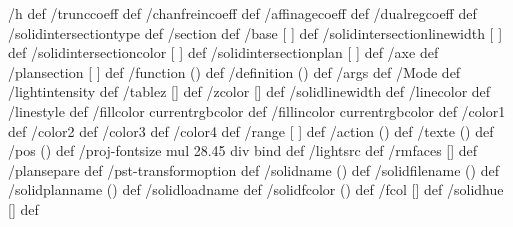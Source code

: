 /h \pst@solides@h\space def %
/trunccoeff \pst@solides@trunccoeff\space def %
/chanfreincoeff \pst@solides@chanfreincoeff\space def %
/affinagecoeff \pst@solides@affinagecoeff\space def %
/dualregcoeff \pst@solides@dualregcoeff\space def %
/solidintersectiontype \pst@solides@intersectiontype\space def %
/section {\pst@solides@section} def %
/base [ \pst@solides@base ] def
/solidintersectionlinewidth [ \pst@solides@intersectionlinewidth ] def
/solidintersectioncolor [ \pst@solides@intersectioncolor ] def
/solidintersectionplan [ \pst@solides@intersectionplan ] def
/axe  { \pst@solides@axe } def
/plansection  [ \pst@solides@plansection ] def
\ifx\pst@solides@function\@empty\else
  /function  (\pst@solides@function) def
\fi
%
/definition  (\pst@solides@definition) def
/args  { \pst@solides@args} def
/Mode \pst@solides@mode\space def %
/lightintensity \pst@solides@lightintensity\space def %
/tablez  [\pst@solides@tablez] def
/zcolor  [\pst@solides@zcolor] def
%
/solidlinewidth {\pst@number\pslinewidth} def
/linecolor  {\pst@usecolor\pslinecolor} def
/linestyle  {\pslinestyle} def
/fillcolor  {\pst@usecolor\psfillcolor currentrgbcolor} def
/fillincolor  {\pst@usecolor\psincolor currentrgbcolor} def
%
/color1 {\pst@usecolor\pscolora } def
/color2 {\pst@usecolor\pscolorb } def
/color3 {\pst@usecolor\pscolorc } def
/color4 {\pst@usecolor\pscolord } def
%
/range [ \pst@solides@range ] def
/action (\pst@solides@action) def
/texte (\pst@solides@text) def
/pos (\pst@solides@pos) def
/proj-fontsize {\pst@solides@fontsize\space \pst@number\psunit mul 28.45 div } bind def
%
\ifx\pst@solides@CoordinatesLight\@empty\else
  /lightsrc {\pst@solides@CoordinatesLight} def
\fi
%
/rmfaces [\pst@solides@CoordinatesRm] def
%
\ifx\pst@solides@plansepare\@empty\else
  /plansepare {\pst@solides@plansepare} def
\fi
%
\ifx\pst@solides@transform\@empty\else
  /pst-transformoption { \pst@solides@transform} def
\fi
%
\ifx\pst@solides@name\@empty\else
  /solidname (\pst@solides@name) def
\fi
\ifx\pst@solides@file\@empty\else
  /solidfilename (\pst@solides@file) def
\fi
%
\ifx\pst@solides@planname\@empty\else
  /solidplanname (\pst@solides@planname) def
\fi
%
\ifx\pst@solides@load\@empty\else
  /solidloadname {\pst@solides@load} def
\fi
%
\ifx\pst@solides@fcolor\@empty\else
  /solidfcolor (\pst@solides@fcolor) def
\fi
%
/fcol [\pst@solides@fcol] def
/solidhue [\pst@solides@hue] def
